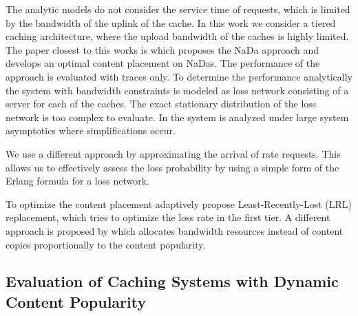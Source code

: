The analytic models do not consider the service time of requests, which is limited by the bandwidth of the uplink of the cache.
In this work we consider a tiered caching architecture, where the upload bandwidth of the caches is highly limited.
The paper closest to this works is \cite{valancius2009greening} which proposes the NaDa approach and develops an optimal content placement on NaDas.
The performance of the approach is evaluated with traces only.
To determine the performance analytically the system with bandwidth constraints is modeled as loss network consisting of a server for each of the caches. The exact stationary distribution of the loss network is too complex to evaluate.
In \cite{tan2013optimal} the system is analyzed under large system asymptotics where simplifications occur.

We use a different approach by approximating the arrival of rate requests.
This allows us to effectively assess the loss probability by using a simple form of the Erlang formula for a loss network.

To optimize the content placement adaptively \cite{leconte2014adaptive} propose Least-Recently-Lost (LRL) replacement, which tries to optimize the loss rate in the first tier.
A different approach is proposed by \cite{zhou2015unifying} which allocates bandwidth resources instead of content copies proportionally to the content popularity.

\subsection{Evaluation of Caching Systems with Dynamic Content Popularity}
